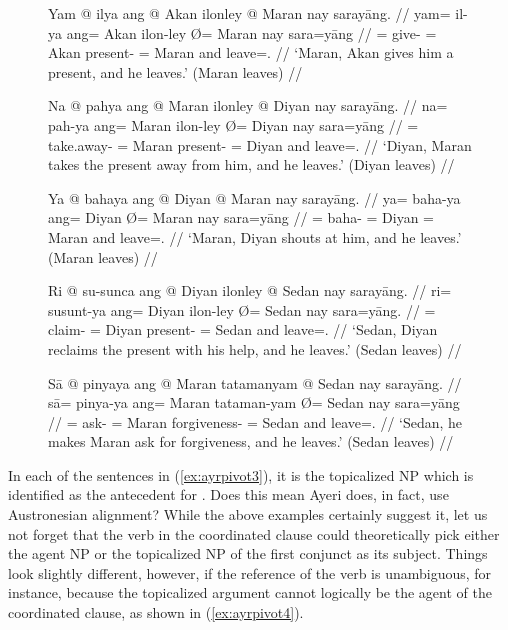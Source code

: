 \begin{figure}
\pex\label{ex:ayrpivot3}
\a\label{ex:ayrpivot3_dat}\begingl
	\gla Yam @ ilya ang @ Akan ilonley {} @ Maran nay sarayāng. //
	\glb yam= il-ya ang= Akan ilon-ley Ø= Maran nay sara=yāng //
	\glc \DatT{}= give-\TsgM{} \Aarg{}= Akan present-\PargI{} \Top{}= Maran
		and leave=\TsgM{}.\Aarg{} //
	\glft `Maran, Akan gives him a present, and he leaves.' (Maran leaves) //
\endgl

\a\label{ex:ayrpivot3_gen}\begingl
	\gla Na @ pahya ang @ Maran ilonley {} @ Diyan nay sarayāng. //
	\glb na= pah-ya ang= Maran ilon-ley Ø= Diyan nay sara=yāng //
	\glc \GenT{}= take.away-\TsgM{} \Aarg{}= Maran present-\PargI{} \Top{}=
		Diyan and leave=\TsgM{}.\Aarg{} //
	\glft `Diyan, Maran takes the present away from him, and he leaves.' (Diyan
		leaves) //
\endgl

\a\label{ex:ayrpivot3_loc}\begingl
	\gla Ya @ bahaya ang @ Diyan {} @ Maran nay sarayāng. //
	\glb ya= baha-ya ang= Diyan Ø= Maran nay sara=yāng //
	\glc \LocT{}= baha-\TsgM{} \Aarg{}= Diyan \Top{}= Maran and 
		leave=\TsgM{}.\Aarg{} //
	\glft `Maran, Diyan shouts at him, and he leaves.' (Maran leaves) //
\endgl

\a\label{ex:ayrpivot3_ins}\begingl
	\gla Ri @ su-sunca ang @ Diyan ilonley {} @ Sedan nay sarayāng. //
	\glb ri= su\til{}sunt-ya ang= Diyan ilon-ley Ø= Sedan nay sara=yāng. //
	\glc \InsT{}= \Iter{}\til{}claim-\TsgM{} \Aarg{}= Diyan present-\PargI{}
		\Top{}= Sedan and leave=\TsgM{}.\Aarg{} //
	\glft `Sedan, Diyan reclaims the present with his help, and he leaves.'
		(Sedan leaves) //
\endgl

\a\label{ex:ayrpivot3_cau}\begingl
	\gla Sā @ pinyaya ang @ Maran tatamanyam {} @ Sedan nay sarayāng. //
	\glb sā= pinya-ya ang= Maran tataman-yam Ø= Sedan nay sara=yāng //
	\glc \CauT{}= ask-\TsgM{} \Aarg{}= Maran forgiveness-\Dat{} \Top{}= Sedan
		and leave=\TsgM{}.\Aarg{} //
	\glft `Sedan, he makes Maran ask for forgiveness, and he leaves.' (Sedan
		leaves) //
\endgl

\xe
\end{figure}

In each of the sentences in (\ref{ex:ayrpivot3}), it is the topicalized NP
which is identified as the antecedent for .
Does this mean Ayeri does, in fact, use Austronesian alignment? While the above
examples certainly suggest it, let us not forget that the verb in the
coordinated clause could theoretically pick either the agent NP or the
topicalized NP of the first conjunct as its subject. Things look slightly
different, however, if the reference of the verb is unambiguous, for instance,
because the topicalized argument cannot logically be the agent of the
coordinated clause, as shown in (\ref{ex:ayrpivot4}).

